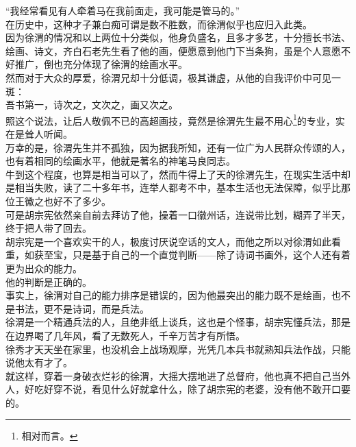 \begin{multicols}{\theparacolNo}
“我经常看见有人牵着马在我前面走，我可能是管马的。”\\

在历史中，这种才子兼白痴可谓是数不胜数，而徐渭似乎也应归入此类。\\

因为徐渭的情况和以上两位十分类似，他身负盛名，且多才多艺，十分擅长书法、绘画、诗文，齐白石老先生看了他的画，便愿意到他门下当条狗，虽是个人意愿不好推广，倒也充分体现了徐渭的绘画水平。\\

然而对于大众的厚爱，徐渭兄却十分低调，极其谦虚，从他的自我评价中可见一斑：\\

吾书第一，诗次之，文次之，画又次之。\\

照这个说法，让后人敬佩不已的高超画技，竟然是徐渭先生最不用心\footnote{相对而言。}的专业，实在是耸人听闻。\\

万幸的是，徐渭先生并不孤独，因为据我所知，还有一位广为人民群众传颂的人，也有着相同的绘画水平，他就是著名的神笔马良同志。\\

牛到这个程度，也算是相当可以了，然而牛得上了天的徐渭先生，在现实生活中却是相当失败，读了二十多年书，连举人都考不中，基本生活也无法保障，似乎比那位王徽之也好不了多少。\\

可是胡宗宪依然亲自前去拜访了他，操着一口徽州话，连说带比划，糊弄了半天，终于把人带了回去。\\

胡宗宪是一个喜欢实干的人，极度讨厌说空话的文人，而他之所以对徐渭如此看重，如获至宝，只是基于自己的一个直觉判断——除了诗词书画外，这个人还有着更为出众的能力。\\

他的判断是正确的。\\

事实上，徐渭对自己的能力排序是错误的，因为他最突出的能力既不是绘画，也不是书法，更不是诗词，而是兵法。\\

徐渭是一个精通兵法的人，且绝非纸上谈兵，这也是个怪事，胡宗宪懂兵法，那是在边界喝了几年风，看了无数死人，千辛万苦才有所悟。\\

徐秀才天天坐在家里，也没机会上战场观摩，光凭几本兵书就熟知兵法作战，只能说他太有才了。\\

就这样，穿着一身破衣烂衫的徐渭，大摇大摆地进了总督府，他也真不把自己当外人，好吃好穿不说，看见什么好就拿什么，除了胡宗宪的老婆，没有他不敢开口要的。\\


\end{multicols}
